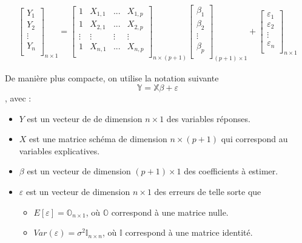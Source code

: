 \documentclass[11pt,french]{report}
\begin{document}
\begin{align*}
\begin{bmatrix} 
Y_1  \\
Y_2  \\
\vdots \\
Y_n \\
\end{bmatrix}_{n\times 1} =
\begin{bmatrix} 
1 & X_{1,1} & ... & X_{1,p} \\
1 & X_{2,1} & ... & X_{2,p}  \\
\vdots & \vdots & \vdots & \vdots \\
1 &  X_{n,1} & ... & X_{n,p} \\
\end{bmatrix}_{n\times (p + 1)} 
\begin{bmatrix} 
\beta_1 \\
\beta_2  \\
\vdots \\
\beta_p \\
\end{bmatrix}_{(p + 1) \times 1}+ 
\begin{bmatrix} 
\varepsilon_1 \\
\varepsilon_2 \\
\vdots \\
\varepsilon_n \\
\end{bmatrix}_{n\times 1} 
\end{align*}

De manière plus compacte, on utilise la notation suivante
$$
\mathbb{Y} = \mathbb{X}  \mathbb{\beta}  + \mathbb{\varepsilon}  
$$
, avec :
\begin{itemize}
\item $Y$ est un vecteur de de dimension $n \times 1$ des variables réponses.
\item $X$ est une matrice schéma de dimension $n \times (p+1)$ qui correspond au variables explicatives.
\item $\beta$ est un vecteur de dimension $(p+1) \times 1$ des coefficients à estimer.
\item $\varepsilon$ est un vecteur de dimension $n \times 1$ des erreurs de telle sorte que
     \begin{itemize}
     \item $E[\varepsilon] = \mathbb{O}_{n\times 1}$, où $\mathbb{O}$ correspond à une matrice nulle.
     \item $Var(\varepsilon) = \sigma^2 \mathbb{I}_{n \times n}$, où $\mathbb{I}$ correspond à une matrice identité.
     \end{itemize}
\end{itemize}
\end{document}

